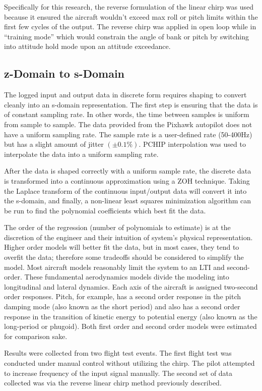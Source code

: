 Specifically for this research, the reverse formulation of the linear chirp was used because it ensured the aircraft wouldn't exceed max roll or pitch limits within the first few cycles of the output.  The reverse chirp was applied in open loop while in \enquote{training mode}  which would constrain the angle of bank or pitch by switching into attitude hold mode upon an attitude exceedance.

\subsection{z-Domain to s-Domain}
The logged input and output data in discrete form requires shaping to convert cleanly into an s-domain representation.  The first step is ensuring that the data is of constant sampling rate.  In other words, the time between samples is uniform from sample to sample.  The data provided from the Pixhawk autopilot does not have a uniform sampling rate.  The sample rate is a user-defined rate (50-400Hz) but has a slight amount of jitter $(\pm 0.1\%)$.  \ac{PCHIP} interpolation was used to interpolate the data into a uniform sampling rate.

After the data is shaped correctly with a uniform sample rate, the discrete data is transformed into a continuous approximation using a \ac{ZOH} technique.  Taking the Laplace transform of the continuous input/output data will convert it into the s-domain, and finally, a non-linear least squares minimization algorithm can be run to find the polynomial coefficients which best fit the data.

The order of the regression (number of polynomials to estimate) is at the discretion of the engineer and their intuition of system's physical representation.  Higher order models will better fit the data, but in most cases, they tend to overfit the data; therefore some tradeoffs should be considered to simplify the model.  Most aircraft models reasonably limit the system to an \ac{LTI} and second-order.  These fundamental aerodynamics models divide the modeling into longitudinal and lateral dynamics.  Each axis of the aircraft is assigned two-second order responses.  Pitch, for example, has a second order response in the pitch damping mode (also known as the short period) and also has a second order response in the transition of kinetic energy to potential energy (also known as the long-period or phugoid).  Both first order and second order models were estimated for comparison sake.

Results were collected from two flight test events.  The first flight test was conducted under manual control without utilizing the chirp.  The pilot attempted to increase frequency of the input signal manually.  The second set of data collected was via the reverse linear chirp method previously described.  

